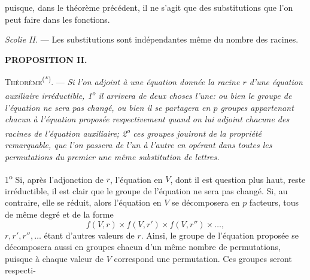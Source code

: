 
puisque, dans le théorème précédent, il ne s'agit que des substitutions
que l'on peut faire dans les fonctions.

\emph{Scolie II.} --- Les substitutions sont indépendantes même du
nombre des racines.

\begin{center}{\bfseries PROPOSITION II.}\end{center}

\noindent\textsc{Théorème}\textsuperscript{(*)}. --- \emph{Si l'on adjoint à une équation donnée la
racine $r$ d'une équation auxiliaire irréductible, 1\textsuperscript{o} il arrivera
de deux choses l'une: ou bien le groupe de l'équation ne sera
pas changé, ou bien il se partagera en $p$ groupes appartenant
chacun à l'équation proposée respectivement quand on lui adjoint
chacune des racines de l'équation auxiliaire; 2\textsuperscript{o} ces
groupes jouiront de la propriété remarquable, que l'on passera
de l'un à l'autre en opérant dans toutes les permutations du
premier une même substitution de lettres.}

1\textsuperscript{o} Si, après l'adjonction de $r$, l'équation en $V$, dont il est
question plus haut, reste irréductible, il est clair que le groupe
de l'équation ne sera pas changé. Si, au contraire, elle se réduit,
alors l'équation en $V$ se décomposera en $p$ facteurs, tous de même
degré et de la forme
\[
f(V,r)\times f(V,r')\times f(V,r'')\times\ldots,
\]
$r,r',r'',\ldots$ étant d'autres valeurs de $r$. Ainsi, le groupe de
l'équation proposée se décomposera aussi en groupes chacun
d'un même nombre de permutations, puisque à chaque valeur
de $V$ correspond une permutation. Ces groupes seront respecti-


